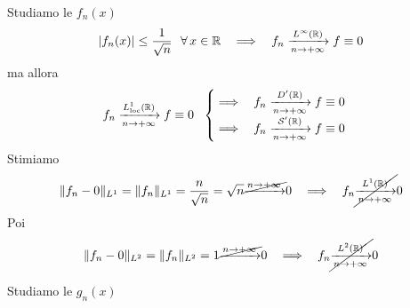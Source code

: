 Studiamo le $f_{n}(x)$
\begin{equation*}
| f_{n}(x)| \leq \frac{1}{\sqrt{n}} \ \ \forall x\in \RR  \ \ \implies \ \ f_{n}\xrightarrow[n\rightarrow + \infty ]{L^{\infty }(\RR)} f\equiv 0
\end{equation*}
ma allora
\begin{equation*}
f_{n}\xrightarrow[n\rightarrow + \infty ]{L^{1}_{\loc}(\RR)} f\equiv 0\ \ 
\begin{cases}
\implies \ \ f_{n}\xrightarrow[n\rightarrow + \infty ]{D'(\RR)} f\equiv 0\\
\implies \ \ f_{n}\xrightarrow[n\rightarrow + \infty ]{\Sc  '(\RR)} f\equiv 0
\end{cases}
\end{equation*}
Stimiamo
\begin{equation*}
\Vert f_{n} - 0\Vert _{L^{1}} = \Vert f_{n}\Vert _{L^{1}} = \frac{n}{\sqrt{n}} = \sqrt{n}\cancel{\xrightarrow{n\rightarrow + \infty }} 0\ \ \implies \ \ f_{n}\cancel{\xrightarrow[n\rightarrow + \infty ]{L^{1}(\RR)}} 0
\end{equation*}
Poi
\begin{equation*}
\Vert f_{n} - 0\Vert _{L^{2}} = \Vert f_{n}\Vert _{L^{2}} = 1\cancel{\xrightarrow{n\rightarrow + \infty }} 0\ \ \implies \ \ f_{n}\cancel{\xrightarrow[n\rightarrow + \infty ]{L^{2}(\RR)}} 0
\end{equation*}


Studiamo le $g_{n}(x)$

